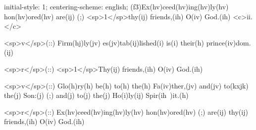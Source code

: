 initial-style: 1;
centering-scheme: english;
(f3)Ex(hv)ceed(hv)ing(hv)ly(hv) hon(hv)ored(hv) are(ij) (;) <sp>1</sp>thy(ij) friends,(ih) O(iv) God.(ih) <c>ii.</c>

<sp>v</sp>(::) Firm(hj)ly(jv) es(jv)tab(ij)lished(i) is(i) their(h) prince(iv)dom.(ij)

<sp>r</sp>(::) <sp>1</sp>Thy(ij) friends,(ih) O(iv) God.(ih)

<sp>v</sp>(::) Glo(h)ry(h) be(h) to(h) the(h) Fa(iv)ther,(jv) and(jv) to(kxjk) the(j) Son:(j) (;) and(j) to(j) the(j) Ho(i)ly(ij) Spir(ih~)it.(h)

<sp>r</sp>(::) Ex(hv)ceed(hv)ing(hv)ly(hv) hon(hv)ored(hv) (;) are(ij) thy(ij) friends,(ih) O(iv) God.(ih)
